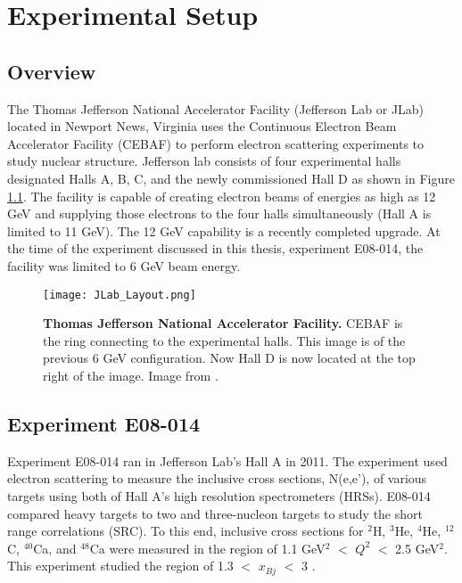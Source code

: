 \chapter{Experimental Setup} %
\label{ch:experiment} %

\section{Overview}
\label{sec:overview}

The Thomas Jefferson National Accelerator Facility (Jefferson Lab or JLab) located in Newport News, Virginia uses the Continuous Electron Beam Accelerator Facility (CEBAF) to perform electron scattering experiments to study nuclear structure. Jefferson lab consists of four experimental halls designated Halls A, B, C, and the newly commissioned Hall D as shown in Figure \ref{fig:jlab}. The facility is capable of creating electron beams of energies as high as 12 GeV and supplying those electrons to the four halls simultaneously (Hall A is limited to 11 GeV). The 12 GeV capability is a recently completed upgrade. At the time of the experiment discussed in this thesis, experiment E08-014, the facility was limited to 6 GeV beam energy.  

\begin{figure}[!ht]
\begin{center}
\texttt{[image: JLab\_Layout.png]}
\end{center}
\caption[Thomas Jefferson National Accelerator Facility]{
{\bf{Thomas Jefferson National Accelerator Facility.}} CEBAF is the ring connecting to the experimental halls. This image is of the previous 6 GeV configuration. Now Hall D is now located at the top right of the image. Image from \cite{Article:HallA}.}
\label{fig:jlab}
\end{figure}

\section{Experiment E08-014}
\label{sec:x>2}
Experiment E08-014 ran in Jefferson Lab's Hall A in 2011. The experiment used electron scattering to measure the inclusive cross sections, N(e,e'), of various targets using both of Hall A's high resolution spectrometers (HRSs). E08-014 compared heavy targets to two and three-nucleon targets to study the short range correlations (SRC). To this end, inclusive cross sections for $^2$H, $^3$He, $^4$He, $^{12}$C, $^{40}$Ca, and $^{48}$Ca were measured in the region of 1.1 GeV$^2$ $<$ $Q^2$ $<$ 2.5 GeV$^2$. This experiment studied the region of 1.3 $<$ $x_{Bj}$ $<$ 3 \cite{Thesis:Ye} \cite{src_website}. 

